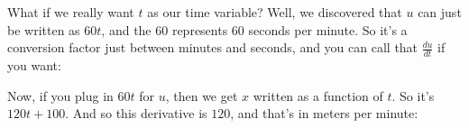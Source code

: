 \documentclass[pdftex, brazil, 12pt, twoside]{article}
\begin{document}
\begin{figure}[H]
  \begin{center}
  \end{center}
\end{figure}

What if we really want $t$ as our time variable?
Well, we discovered that $u$ can just be written as $60t$,
and the $60$ represents $60$ seconds per minute.
So it's a conversion factor just between minutes and seconds,
and you can call that $\displaystyle \frac{du}{dt}$ if you want:

\begin{figure}[H]
  \begin{center}
  \end{center}
\end{figure}

Now, if you plug in $60t$ for $u$, then we
get $x$ written as a function of $t$.
So it's $120t + 100$.
And so this derivative is $120$, and that's
in meters per minute:

\begin{figure}[H]
  \begin{center}
  \end{center}
\end{figure}
\end{document}
